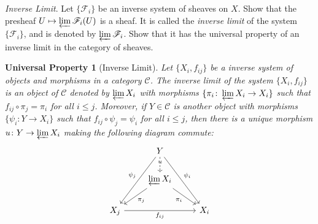 \documentclass[10pt]{article}
\newtheorem*{universalproperty}{Universal Property}
\theoremstyle{definition}
\theoremstyle{remark}
\numberwithin{equation}{section}
\numberwithin{figure}{subsubsection}
\begin{document}
\begin{problem}
  \emph{Inverse Limit}. Let $\{\mathscr{F}_i\}$ be an inverse system of sheaves on $X$. Show that the presheaf $U \mapsto \varprojlim \mathscr{F}_i(U)$ is a sheaf. It is called the \emph{inverse limit} of the system $\{\mathscr{F}_i\}$, and is denoted by $\varprojlim \mathscr{F}_i$. Show that it has the universal property of an inverse limit in the category of sheaves.
\end{problem}
\begin{universalproperty}[Inverse Limit]
  Let $\{X_i,f_{ij}\}$ be a inverse system of objects and morphisms in a category $\mathscr{C}$. The \emph{inverse limit} of the system $\{X_i,f_{ij}\}$ is an object of $\mathscr{C}$ denoted by $\varprojlim X_i$ with morphisms $\{\pi_i \colon \varprojlim X_i \to X_i\}$ such that $f_{ij} \circ \pi_j = \pi_i$ for all $i \le j$. Moreover, if $Y \in \mathscr{C}$ is another object with morphisms $\{\psi_i\colon Y \to X_i\}$ such that $f_{ij} \circ \psi_j = \psi_i$ for all $i \le j$, then there is a unique morphism $u\colon Y \to \varprojlim X_i$ making the following diagram commute:
  \begin{equation*}
    \begin{tikzcd}
      {}& Y\arrow[dashed]{d}[description,yshift=3pt]{u}\arrow{ddl}[swap]{\psi_j}\arrow{ddr}{\psi_i}\\
      & \varprojlim X_i\arrow{dl}{\pi_j}\arrow{dr}[swap]{\pi_i}\\
      X_j \arrow{rr}[swap]{f_{ij}} & & X_i
    \end{tikzcd}
  \end{equation*}
\end{universalproperty}
\end{document}
